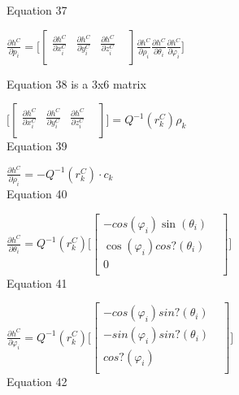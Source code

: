Equation 37



\begin{center}$\frac{\partial h^{C}}{\partial p_{i}}=\lbrack 
\begin{bmatrix}
\frac{\partial h^{C}}{\partial x_{i}^{C}} & \frac{\partial 
h^{C}}{\partial y_{i}^{C}} & \frac{\partial h^{C}}{\partial z_{i}^{C}} & 
\\
\end{bmatrix}
\frac{\partial h^{C}}{\partial \rho _{i}}\frac{\partial h^{C}}{\partial 
\theta _{i}}\frac{\partial h^{C}}{\partial \varphi _{i}}\rbrack $\\
\end{center}

Equation 38 is a 3x6 matrix

$\lbrack \begin{bmatrix}
\frac{\partial h^{C}}{\partial x_{i}^{C}} & \frac{\partial 
h^{C}}{\partial y_{i}^{C}} & \frac{\partial h^{C}}{\partial z_{i}^{C}} & 
\\
\end{bmatrix}
\rbrack =Q^{-1}(r_{k}^{C})\rho _{k}$\\


Equation 39

$\frac{\partial h^{C}}{\partial \rho _{i}}=-Q^{-1}(r_{k}^{C})\cdot 
c_{k}$\\


Equation 40

$\frac{\partial h^{C}}{\partial \theta _{i}}=Q^{-1}(r_{k}^{C})\lbrack 
\begin{bmatrix}
-cos(\varphi _{i})\sin (\theta _{i}) & \\
\cos (\varphi _{i})cos?(\theta _{i}) & \\
0 & \\
\end{bmatrix}
\rbrack $\\


Equation 41

$\frac{\partial h^{C}}{\partial \varphi _{i}}= Q^{-1}(r_{k}^{C})\lbrack 
\begin{bmatrix}
-cos(\varphi _{i})sin?(\theta _{i}) & \\
-sin(\varphi _{i})sin?(\theta _{i}) & \\
cos?(\varphi _{i}) & \\
\end{bmatrix}
\rbrack $\\


Equation 42

